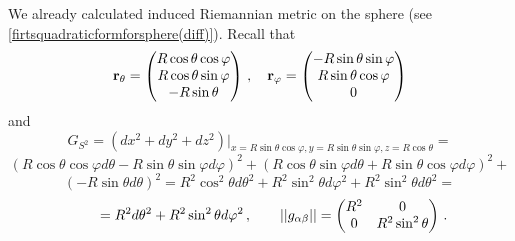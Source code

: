 \documentclass[12pt]{article}
\theoremstyle{theorem}
\numberwithin{equation}{section}
\begin{document}
{\medskip

We already calculated induced Riemannian metric on the sphere (see \eqref{firtsquadraticformforsphere(diff)}).
 Recall that
    $$
  {\bf r}_\theta=\begin{pmatrix}
        R\cos\theta\cos\varphi\\
        R\cos\theta\sin\varphi\\
        -R\sin\theta\\
   \end{pmatrix}\,,
\quad
  {\bf r}_\varphi=\begin{pmatrix}
        -R\sin\theta\sin\varphi\\
        R\sin\theta\cos\varphi\\
          0\\
   \end{pmatrix}
  $$
 and
            $$
              G_{S^2}=\left(dx^2+dy^2+dz^2\right)\big\vert_{x=R\sin\theta\cos\varphi,y=R\sin\theta\sin\varphi,
              z=R\cos\theta}=
                      $$
                      $$
                      (R\cos\theta\cos\varphi d\theta-R\sin\theta\sin\varphi d\varphi)^2+
                      (R\cos\theta\sin\varphi d\theta+R\sin\theta\cos\varphi d\varphi)^2+
                      $$
                      $$
                      (-R\sin\theta d\theta)^2=
          R^2\cos^2\theta d\theta^2+R^2\sin^2\theta d\varphi^2+R^2\sin^2\theta d\theta^2=
                      $$
        \begin{equation*}\label{firtsquadraticformforsphere(diff)}
           \qquad
             =R^2d\theta^2+R^2\sin^2\theta d\varphi^2\,,\qquad
                        ||g_{\alpha\beta}||=
   \begin{pmatrix}
   R^2 & 0 \\
   0&  R^2\sin^2\theta \\
   \end{pmatrix}\,.
                       \end{equation*}

}
\end{document}
